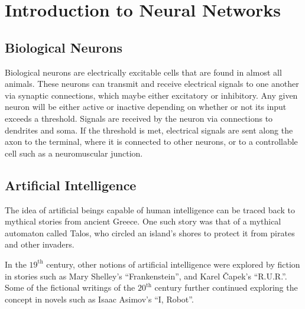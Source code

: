 \chapter{Introduction to Neural Networks}


\section{Biological Neurons}

Biological neurons are electrically excitable cells that are found in almost all
animals.
These neurons can transmit and receive electrical signals to one another via
synaptic connections, which maybe either excitatory or inhibitory.
Any given neuron will be either active or inactive depending on whether or not
its input exceeds a threshold.
Signals are received by the neuron via connections to dendrites and soma.
If the threshold is met, electrical signals are sent along the axon to the
terminal, where it is connected to other neurons, or to a controllable cell such
as a neuromuscular junction.




\section{Artificial Intelligence}

The idea of artificial beings capable of human intelligence can be traced back
to mythical stories from ancient Greece.
One such story was that of a mythical automaton called Talos, who circled an
island's shores to protect it from pirates and other invaders.

In the $19^\text{th}$ century, other notions of artificial intelligence were
explored by fiction in stories such as Mary Shelley's ``Frankenstein'', and
Karel \v{C}apek's ``R.U.R.''.
Some of the fictional writings of the $20^\text{th}$ century further continued
exploring the concept in novels such as Isaac Asimov's ``I, Robot''.



